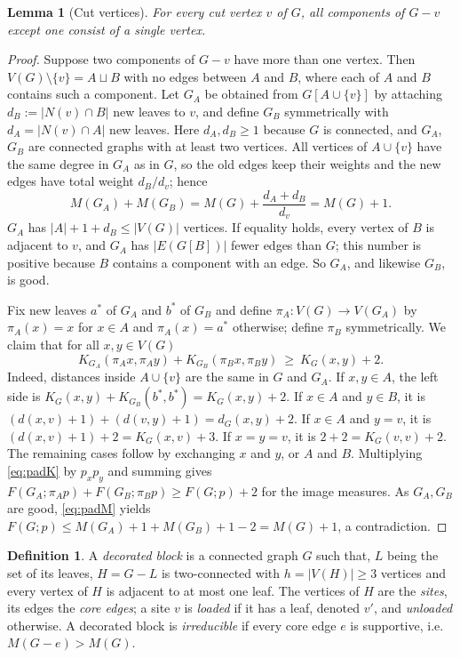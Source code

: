 \documentclass[11pt,a4paper]{article}
\newtheorem{lemma}[theorem]{Lemma}
\theoremstyle{definition}
\newtheorem{definition}[theorem]{Definition}
\theoremstyle{remark}
\numberwithin{equation}{section}
\begin{document}
\begin{lemma}[Cut vertices]\label{lem:cut}
For every cut vertex $v$ of $G$, all components of $G-v$ except one consist of a
single vertex.
\end{lemma}
\begin{proof}
Suppose two components of $G-v$ have more than one vertex. Then
$V(G)\setminus\{v\}=A\sqcup B$ with no edges between $A$ and $B$, where each of $A$
and $B$ contains such a component. Let $G_A$ be obtained from $G[A\cup\{v\}]$ by
attaching $d_B:=|N(v)\cap B|$ new leaves to $v$, and define $G_B$ symmetrically with
$d_A=|N(v)\cap A|$ new leaves. Here $d_A,d_B\ge1$ because $G$ is connected, and
$G_A$, $G_B$ are connected graphs with at least two vertices. All vertices of $A\cup\{v\}$ have the same degree in
$G_A$ as in $G$, so the old edges keep their weights and the new edges have total
weight $d_B/d_v$; hence
\begin{equation}\label{eq:padM}
 M(G_A)+M(G_B)=M(G)+\frac{d_A+d_B}{d_v}=M(G)+1 .
\end{equation}
$G_A$ has $|A|+1+d_B\le|V(G)|$ vertices. If equality holds, every vertex of $B$ is
adjacent to $v$, and $G_A$ has $|E(G[B])|$ fewer edges than $G$; this number is
positive because $B$ contains a component with an edge. So $G_A$, and likewise
$G_B$, is good.

Fix new leaves $a^\ast$ of $G_A$ and $b^\ast$ of $G_B$ and define
$\pi_A\colon V(G)\to V(G_A)$ by $\pi_A(x)=x$ for $x\in A$ and $\pi_A(x)=a^\ast$
otherwise; define $\pi_B$ symmetrically. We claim that for all $x,y\in V(G)$
\begin{equation}\label{eq:padK}
 K_{G_A}(\pi_Ax,\pi_Ay)+K_{G_B}(\pi_Bx,\pi_By)\ \ge\ K_G(x,y)+2 .
\end{equation}
Indeed, distances inside $A\cup\{v\}$ are the same in $G$ and $G_A$. If
$x,y\in A$, the left side is $K_G(x,y)+K_{G_B}(b^\ast,b^\ast)=K_G(x,y)+2$. If
$x\in A$ and $y\in B$, it is $(d(x,v)+1)+(d(v,y)+1)=d_G(x,y)+2$. If $x\in A$ and
$y=v$, it is $(d(x,v)+1)+2=K_G(x,v)+3$. If $x=y=v$, it is $2+2=K_G(v,v)+2$. The
remaining cases follow by exchanging $x$ and $y$, or $A$ and $B$. Multiplying \eqref{eq:padK} by $p_xp_y$ and summing gives
$F(G_A;\pi_Ap)+F(G_B;\pi_Bp)\ge F(G;p)+2$ for the image measures. As $G_A,G_B$ are
good, \eqref{eq:padM} yields $F(G;p)\le M(G_A)+1+M(G_B)+1-2=M(G)+1$, a contradiction.
\end{proof}

\begin{definition}\label{def:block}
A \emph{decorated block} is a connected graph $G$ such that, $L$ being the set of
its leaves, $H=G-L$ is two-connected with $h=|V(H)|\ge3$ vertices and every vertex
of $H$ is adjacent to at most one leaf. The vertices of $H$ are the \emph{sites},
its edges the \emph{core edges}; a site $v$ is \emph{loaded} if it has a leaf,
denoted $v'$, and \emph{unloaded} otherwise. A decorated block is
\emph{irreducible} if every core edge $e$ is supportive, i.e.\ $M(G-e)>M(G)$.
\end{definition}
\end{document}
